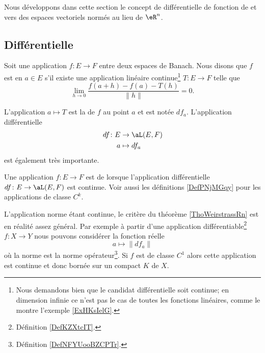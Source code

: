 Nous développons dans cette section le concept de différentielle de fonction de et vers des espaces vectoriels normés au lieu de \( \eR^n\).

\subsection{Différentielle}

\begin{definition}  \label{DefKZXtcIT}
    Soit une application \( f\colon E\to F\) entre deux espaces de Banach. Nous disons que \( f\) est  en \( a\in E\) s'il existe une application linéaire continue\footnote{Nous demandons bien que le candidat différentielle soit continue; en dimension infinie ce n'est pas le cas de toutes les fonctions linéaires, comme le montre l'exemple \ref{ExHKsIelG}.} \( T\colon E\to F\) telle que
    \begin{equation}\label{EqIQuRGmO}
        \lim_{h\to 0} \frac{ f(a+h)-f(a)-T(h) }{ \| h \| }=0.
    \end{equation}
\end{definition}

L'application \( a\mapsto T\) est la  de \( f\) au point \( a\) et est notée \( df_a\). L'application différentielle
\begin{equation}
    \begin{aligned}
        df\colon E&\to \aL(E,F) \\
        a&\mapsto df_a 
    \end{aligned}
\end{equation}
est également très importante. 

\begin{definition}      \label{DefJYBZooPTsfZx}
Une application \( f\colon E\to F\) est de  lorsque l'application différentielle \( df\colon E\to \aL(E,F)\) est continue. Voir aussi les définitions \ref{DefPNjMGqy} pour les applications de classe \( C^k\).
\end{definition}

\begin{remark}      \label{RemATQVooDnZBbs}
    L'application norme étant continue, le critère du théorème \ref{ThoWeirstrassRn} est en réalité assez général. Par exemple à partir d'une application différentiable\footnote{Définition \ref{DefKZXtcIT}.} \( f\colon X\to Y\)  nous pouvons considérer la fonction réelle
    \begin{equation}
        a\mapsto \|  df_a   \|
    \end{equation}
    où la norme est la norme opérateur\footnote{Définition \ref{DefNFYUooBZCPTr}.}. Si \( f\) est de classe \( C^1\) alors cette application est continue et donc bornée sur un compact \( K\) de \( X\).
\end{remark}

